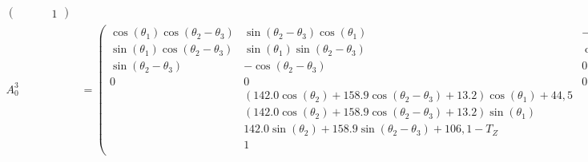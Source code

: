 \documentclass[a4paper,12pt]{article}
\begin{document}
{\begin{align}
\begin{pmatrix}
                                                                                   & \qquad 1
    \end{pmatrix} \label{eq:A03_param} \\
    A_0^3 & =
    \begin{pmatrix}
        \cos{\left(\theta_{1} \right)} \cos{\left(\theta_{2} - \theta_{3} \right)} & \sin{\left(\theta_{2} - \theta_{3} \right)} \cos{\left(\theta_{1} \right)}                                                                         & - \sin{\left(\theta_{1} \right)} \\
        \sin{\left(\theta_{1} \right)} \cos{\left(\theta_{2} - \theta_{3} \right)} & \sin{\left(\theta_{1} \right)} \sin{\left(\theta_{2} - \theta_{3} \right)}                                                                         & \cos{\left(\theta_{1} \right)}   \\
        \sin{\left(\theta_{2} - \theta_{3} \right)}                                & - \cos{\left(\theta_{2} - \theta_{3} \right)}                                                                                                      & 0                                \\
        0                                                                          & 0                                                                                                                                                  & 0                                \\
                                                                                   & \left(142.0 \cos{\left(\theta_{2} \right)} + 158.9 \cos{\left(\theta_{2} - \theta_{3} \right)} + 13.2\right) \cos{\left(\theta_{1} \right)} + 44,5                                    \\
                                                                                   & \left(142.0 \cos{\left(\theta_{2} \right)} + 158.9 \cos{\left(\theta_{2} - \theta_{3} \right)} + 13.2\right) \sin{\left(\theta_{1} \right)}                                           \\
                                                                                   & 142.0 \sin{\left(\theta_{2} \right)} + 158.9 \sin{\left(\theta_{2} - \theta_{3} \right)} + 106,1 - T_Z                                                                                \\
                                                                                   & 1                                                                                                                                                                                     \\
    \end{pmatrix} \label{eq:A03_num}
\end{align}}
\end{document}

